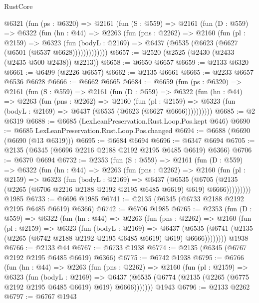 \begin{lexlean}{RustCore}
\begin{coremodule}
    @6321
      (fun (ps : @6320) =>
      @2161
        (fun (S : @559) =>
        @2161
          (fun (D : @559) =>
          @6322
            (fun (hn : @44) =>
            @2263
              (fun (pns : @2262) =>
              @2160
                (fun (pl : @2159) =>
                @6323
                  (fun (bodyL : @2169) =>
                  @6437 (@6535 (@6623 (@6627 (@6501 (@6537 @6628)))))))))))))
@6657 := @2520 (@2525 (@2430 (@2433 (@2435 @500 @2438)) @2213))
@6658 := @6650 @6657
@6659 := @2133 @6320
@6661 := @6499 (@2226 @6657)
@6662 := @2135 @6661
@6665 := @2233 @6657 @6536 @6628
@6666 := @6662 @6665
@6684 := @6659
    (fun (ps : @6320) =>
    @2161
      (fun (S : @559) =>
      @2161
        (fun (D : @559) =>
        @6322
          (fun (hn : @44) =>
          @2263
            (fun (pns : @2262) =>
            @2160
              (fun (pl : @2159) =>
              @6323 (fun (bodyL : @2169) => @6437 (@6535 (@6623 (@6627 @6666))))))))))
@6685 := @2 @6319
@6688 := @6685 (LexLeanPreservation.Rust.Loop.Pos.kept @646)
@6690 := @6685 LexLeanPreservation.Rust.Loop.Pos.changed
@6694 := @6688 (@6690 (@6690 (@13 @6319)))
@6695 := @6684 @6694
@6696 := @6347 @6694
@6705 := @2135 (@6345 (@6696 @2216 @2188 @2192 @2195 @6485 @6619) @6366)
@6706 := @6370 @6694
@6732 := @2353
    (fun (S : @559) =>
    @2161
      (fun (D : @559) =>
      @6322
        (fun (hn : @44) =>
        @2263
          (fun (pns : @2262) =>
          @2160
            (fun (pl : @2159) =>
            @6323
              (fun (bodyL : @2169) =>
              @6437
                (@6535
                  (@6705
                    (@2135 (@2265 (@6706 @2216 @2188 @2192 @2195 @6485 @6619) @619) @6666)))))))))
    @1985
@6733 := @6696 @1985
@6741 := @2135 (@6345 (@6733 @2188 @2192 @2195 @6485 @6619) @6366)
@6742 := @6706 @1985
@6765 := @2353
    (fun (D : @559) =>
    @6322
      (fun (hn : @44) =>
      @2263
        (fun (pns : @2262) =>
        @2160
          (fun (pl : @2159) =>
          @6323
            (fun (bodyL : @2169) =>
            @6437
              (@6535 (@6741 (@2135 (@2265 (@6742 @2188 @2192 @2195 @6485 @6619) @619) @6666))))))))
    @1938
@6766 := @2133 @44
@6767 := @6733 @1938
@6774 := @2135 (@6345 (@6767 @2192 @2195 @6485 @6619) @6366)
@6775 := @6742 @1938
@6795 := @6766
    (fun (hn : @44) =>
    @2263
      (fun (pns : @2262) =>
      @2160
        (fun (pl : @2159) =>
        @6323
          (fun (bodyL : @2169) =>
          @6437 (@6535 (@6774 (@2135 (@2265 (@6775 @2192 @2195 @6485 @6619) @619) @6666)))))))
    @1943
@6796 := @2133 @2262
@6797 := @6767 @1943

\end{coremodule}
\end{lexlean}
